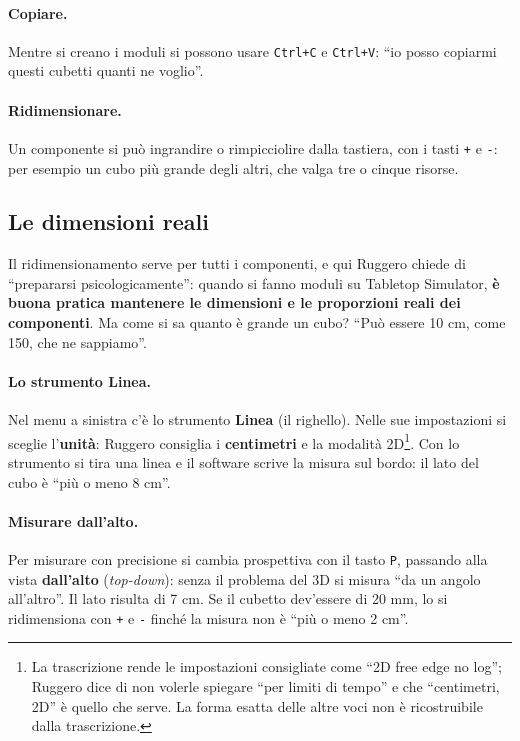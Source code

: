 \paragraph{Copiare.} Mentre si creano i moduli si possono usare \texttt{Ctrl+C} e
\texttt{Ctrl+V}: ``io posso copiarmi questi cubetti quanti ne voglio''.

\paragraph{Ridimensionare.} Un componente si può ingrandire o rimpicciolire dalla
tastiera, con i tasti \texttt{+} e \texttt{-}: per esempio un cubo più grande degli
altri, che valga tre o cinque risorse.

\subsection{Le dimensioni reali}
\label{a8:sec:misurare}

Il ridimensionamento serve per tutti i componenti, e qui Ruggero chiede di
``prepararsi psicologicamente'': quando si fanno moduli su Tabletop Simulator,
\textbf{è buona pratica mantenere le dimensioni e le proporzioni reali dei
componenti}. Ma come si sa quanto è grande un cubo? ``Può essere 10 cm, come 150, che
ne sappiamo''.

\paragraph{Lo strumento Linea.} Nel menu a sinistra c'è lo strumento \textbf{Linea}
(il righello). Nelle sue impostazioni si sceglie l'\textbf{unità}: Ruggero consiglia i
\textbf{centimetri} e la modalità 2D\footnote{La trascrizione rende le impostazioni
consigliate come ``2D free edge no log''; Ruggero dice di non volerle spiegare ``per
limiti di tempo'' e che ``centimetri, 2D'' è quello che serve. La forma esatta delle
altre voci non è ricostruibile dalla trascrizione.}. Con lo strumento si tira una
linea e il software scrive la misura sul bordo: il lato del cubo è ``più o meno 8
cm''.

\paragraph{Misurare dall'alto.} Per misurare con precisione si cambia prospettiva con
il tasto \texttt{P}, passando alla vista \textbf{dall'alto} (\emph{top-down}): senza
il problema del 3D si misura ``da un angolo all'altro''. Il lato risulta di 7 cm.
Se il cubetto dev'essere di 20 mm, lo si ridimensiona con \texttt{+} e \texttt{-}
finché la misura non è ``più o meno 2 cm''.

